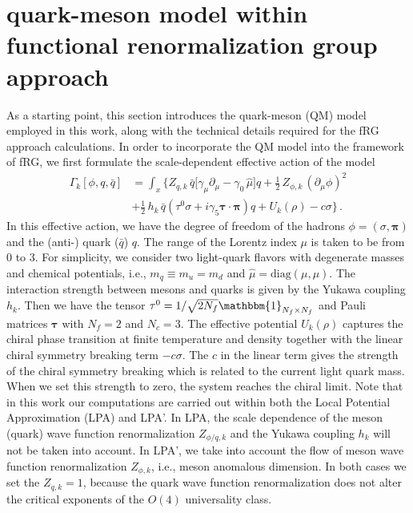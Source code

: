\documentclass[aps,twocolumn,prd,superscriptaddress,nofootinbib,floatfix]{revtex4-2}
\begin{document}
\section{quark-meson model within functional renormalization group approach}
\label{sec:QM_frg} 
As a starting point, this section introduces the quark-meson (QM) model employed in this work, along with the technical details required for the fRG approach calculations. In order to incorporate the QM model into the framework of fRG, we first formulate the scale-dependent effective action of the model
%
\begin{align}\label{eq:action}
\Gamma_k[\phi,q,\bar{q}]&=\int_x \bigg\{
 Z_{q,k}\,\bar q\big[\gamma_\mu \partial_\mu-\gamma_0\,\hat \mu\big]q + \frac{1}{2}\,Z_{\phi,k}\,(\partial_\mu\phi)^2\nonumber\\[2ex]
&+\frac{1}{2}\,h_k\,\bar q(\tau^0 \sigma+i\gamma_5 \boldsymbol{\tau}\cdot\boldsymbol{\pi})q+U_k(\rho)-c\sigma\bigg\}\,.
\end{align}
%
In this effective action, we have the degree of freedom of the hadrons $\phi=(\sigma,\boldsymbol{\pi})$ and the (anti-) quark ($\bar q$) $q$. The range of the Lorentz index $\mu$ is taken to be from 0 to 3. For simplicity, we consider two light-quark flavors with degenerate masses and chemical potentials, i.e., $m_q\equiv m_u=m_d$ and $\hat\mu=\mathrm{diag}(\mu,\mu)$. The interaction strength between mesons and quarks is given by the Yukawa coupling $h_k$. Then we have the tensor $\tau^0=1/\sqrt{2N_f}\mathbbm{1}_{N_f\times N_f}$ and Pauli matrices $\boldsymbol{\tau}$ with $N_f=2$ and $N_c=3$. The effective potential $U_k(\rho)$ captures the chiral phase transition at finite temperature and density together with the linear chiral symmetry breaking term $-c\sigma$. The $c$ in the linear term gives the strength of the chiral symmetry breaking which is related to the current light quark mass. When we set this strength to zero, the system reaches the chiral limit. Note that in this work our computations are carried out within both the Local Potential Approximation (LPA) and LPA'. In LPA, the scale dependence of the meson (quark) wave function renormalization $Z_{\phi/q,k}$ and the Yukawa coupling $h_k$ will not be taken into account. In LPA', we take into account the flow of meson wave function renormalization $Z_{\phi,k}$, i.e., meson anomalous dimension. In both cases we set the $Z_{q,k}=1$, because the quark wave function renormalization does not alter the critical exponents of the $O(4)$ universality class.
\end{document}
